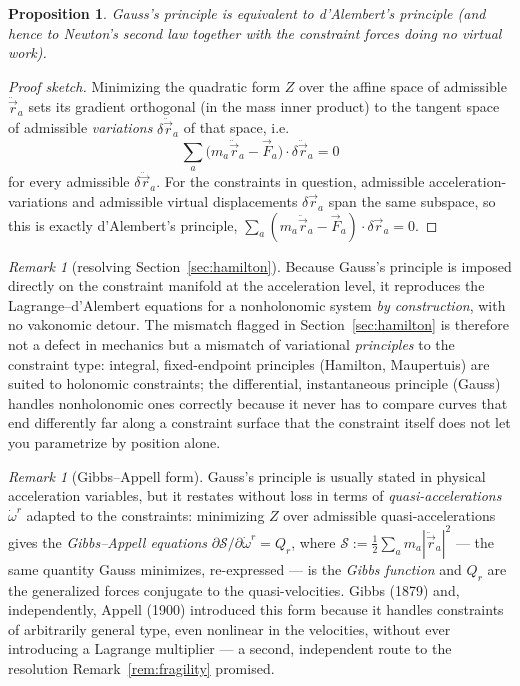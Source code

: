 \documentclass[11pt]{book}
\theoremstyle{definition}
\theoremstyle{plain}
\newtheorem{proposition}[definition]{Proposition}
\theoremstyle{remark}
\newtheorem{remark}[definition]{Remark}
\begin{document}
\begin{proposition}
\label{prop:gauss-dalembert}
Gauss's principle is equivalent to d'Alembert's principle (and hence to Newton's second law together with the constraint forces doing no virtual work).
\end{proposition}
\begin{proof}[Proof sketch]
Minimizing the quadratic form $Z$ over the affine space of admissible $\ddot{\vec r}_a$ sets its gradient orthogonal (in the mass inner product) to the tangent space of admissible \emph{variations} $\delta\ddot{\vec r}_a$ of that space, i.e.
\[
\sum_a \big(m_a\ddot{\vec r}_a - \vec F_a\big)\cdot \delta\ddot{\vec r}_a = 0
\]
for every admissible $\delta \ddot{\vec r}_a$. For the constraints in question, admissible acceleration-variations and admissible virtual displacements $\delta \vec r_a$ span the same subspace, so this is exactly d'Alembert's principle, $\sum_a(m_a\ddot{\vec r}_a-\vec F_a)\cdot\delta\vec r_a=0$.
\end{proof}

\begin{remark}[resolving Section~\ref{sec:hamilton}]
Because Gauss's principle is imposed directly on the constraint manifold at the acceleration level, it reproduces the Lagrange--d'Alembert equations for a nonholonomic system \emph{by construction}, with no vakonomic detour. The mismatch flagged in Section~\ref{sec:hamilton} is therefore not a defect in mechanics but a mismatch of variational \emph{principles} to the constraint type: integral, fixed-endpoint principles (Hamilton, Maupertuis) are suited to holonomic constraints; the differential, instantaneous principle (Gauss) handles nonholonomic ones correctly because it never has to compare curves that end differently far along a constraint surface that the constraint itself does not let you parametrize by position alone.
\end{remark}

\begin{remark}[Gibbs--Appell form]
Gauss's principle is usually stated in physical acceleration variables, but it restates without loss in terms of \emph{quasi-accelerations} $\dot\omega^r$ adapted to the constraints: minimizing $Z$ over admissible quasi-accelerations gives the \emph{Gibbs--Appell equations} $\partial\mathcal S/\partial\dot\omega^r = Q_r$, where $\mathcal S:=\tfrac12\sum_a m_a|\ddot{\vec r}_a|^2$ --- the same quantity Gauss minimizes, re-expressed --- is the \emph{Gibbs function} and $Q_r$ are the generalized forces conjugate to the quasi-velocities. Gibbs (1879) and, independently, Appell (1900) introduced this form because it handles constraints of arbitrarily general type, even nonlinear in the velocities, without ever introducing a Lagrange multiplier --- a second, independent route to the resolution Remark~\ref{rem:fragility} promised.
\end{remark}
\end{document}
